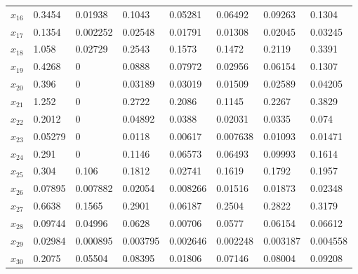 \documentclass[11pt,a4paper]{article}
\numberwithin{equation}{section}
\begin{document}
\begin{table}[H]
\begin{tabular}{llllllll}
$x_{16}$ & 0.3454  & 0.01938  & 0.1043   & 0.05281       & 0.06492      & 0.09263      & 0.1304       \\
$x_{17}$ & 0.1354  & 0.002252 & 0.02548  & 0.01791       & 0.01308      & 0.02045      & 0.03245      \\
$x_{18}$ & 1.058   & 0.02729  & 0.2543   & 0.1573        & 0.1472       & 0.2119       & 0.3391       \\
$x_{19}$ & 0.4268  & 0        & 0.0888   & 0.07972       & 0.02956      & 0.06154      & 0.1307       \\
$x_{20}$ & 0.396   & 0        & 0.03189  & 0.03019       & 0.01509      & 0.02589      & 0.04205      \\
$x_{21}$ & 1.252   & 0        & 0.2722   & 0.2086        & 0.1145       & 0.2267       & 0.3829       \\
$x_{22}$ & 0.2012  & 0        & 0.04892  & 0.0388        & 0.02031      & 0.0335       & 0.074        \\
$x_{23}$ & 0.05279 & 0        & 0.0118   & 0.00617       & 0.007638     & 0.01093      & 0.01471      \\
$x_{24}$ & 0.291   & 0        & 0.1146   & 0.06573       & 0.06493      & 0.09993      & 0.1614       \\
$x_{25}$ & 0.304   & 0.106    & 0.1812   & 0.02741       & 0.1619       & 0.1792       & 0.1957       \\
$x_{26}$ & 0.07895 & 0.007882 & 0.02054  & 0.008266      & 0.01516      & 0.01873      & 0.02348      \\
$x_{27}$ & 0.6638  & 0.1565   & 0.2901   & 0.06187       & 0.2504       & 0.2822       & 0.3179       \\
$x_{28}$ & 0.09744 & 0.04996  & 0.0628   & 0.00706       & 0.0577       & 0.06154      & 0.06612      \\
$x_{29}$ & 0.02984 & 0.000895 & 0.003795 & 0.002646      & 0.002248     & 0.003187     & 0.004558     \\
$x_{30}$ & 0.2075  & 0.05504  & 0.08395  & 0.01806       & 0.07146      & 0.08004      & 0.09208      \\ \hline
\end{tabular}
\end{table}
\end{document}
